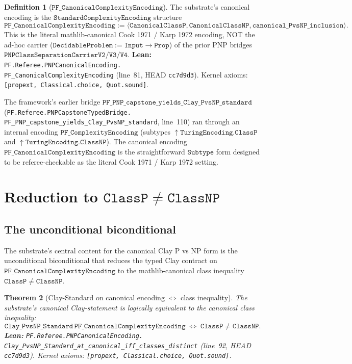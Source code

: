 \documentclass[11pt,a4paper]{article}
\theoremstyle{plain}
\newtheorem{theorem}{Theorem}[section]
\theoremstyle{definition}
\newtheorem{definition}[theorem]{Definition}
\begin{document}
\begin{definition}[$\mathtt{PF\_CanonicalComplexityEncoding}$]
\label{def:pf-canonical-encoding}
The substrate's canonical encoding is the
$\mathtt{StandardComplexityEncoding}$ structure
\[
\mathtt{PF\_CanonicalComplexityEncoding} :=
\langle
\mathtt{CanonicalClassP},
\mathtt{CanonicalClassNP},
\mathtt{canonical\_PvsNP\_inclusion}
\rangle.
\]
This is the literal mathlib-canonical Cook 1971 / Karp 1972 encoding,
NOT the ad-hoc carrier ($\mathtt{DecidableProblem := Input \to Prop}$)
of the prior PNP bridges
$\mathtt{PNPClassSeparationCarrierV2/V3/V4}$.
\textbf{Lean:}
\texttt{PF.Referee.PNPCanonicalEncoding.\\
PF\_CanonicalComplexityEncoding}
(line~81, HEAD \texttt{cc7d9d3}). Kernel axioms:
\texttt{[propext, Classical.choice, Quot.sound]}.
\end{definition}

The framework's earlier bridge
$\mathtt{PF\_PNP\_capstone\_yields\_Clay\_PvsNP\_standard}$
(\texttt{PF.Referee.PNPCapstoneTypedBridge.\\
PF\_PNP\_capstone\_yields\_Clay\_PvsNP\_standard}, line~110) ran
through an internal encoding
$\mathtt{PF\_ComplexityEncoding}$ (subtypes
$\uparrow\!\!\mathtt{TuringEncoding.ClassP}$ and
$\uparrow\!\!\mathtt{TuringEncoding.ClassNP}$). The canonical
encoding $\mathtt{PF\_CanonicalComplexityEncoding}$ is the
straightforward $\mathtt{Subtype}$ form designed to be referee-checkable
as the literal Cook 1971 / Karp 1972 setting.

\section{Reduction to $\mathtt{ClassP} \neq \mathtt{ClassNP}$}
\label{sec:reduction}

\subsection{The unconditional biconditional}
\label{sec:biconditional}

The substrate's central content for the canonical Clay P vs NP form
is the unconditional biconditional that reduces the typed Clay
contract on $\mathtt{PF\_CanonicalComplexityEncoding}$ to the
mathlib-canonical class inequality $\mathtt{ClassP} \neq
\mathtt{ClassNP}$.

\begin{theorem}[Clay-Standard on canonical encoding $\Leftrightarrow$
class inequality]
\label{thm:canonical-iff-distinct}
The substrate's canonical Clay-statement is logically equivalent to
the canonical class inequality:
\[
\mathtt{Clay\_PvsNP\_Standard}\,
\mathtt{PF\_CanonicalComplexityEncoding}
\;\Longleftrightarrow\;
\mathtt{ClassP} \neq \mathtt{ClassNP}.
\]
\textbf{Lean:}
\texttt{PF.Referee.PNPCanonicalEncoding.\\
Clay\_PvsNP\_Standard\_at\_canonical\_iff\_classes\_distinct}
(line~92, HEAD \texttt{cc7d9d3}). Kernel axioms:
\texttt{[propext, Classical.choice, Quot.sound]}.
\end{theorem}
\end{document}
